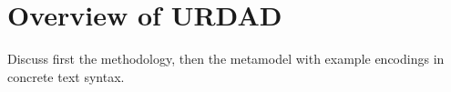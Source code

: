 \section{Overview of URDAD}

Discuss first the methodology, then the metamodel with example encodings in concrete text syntax.